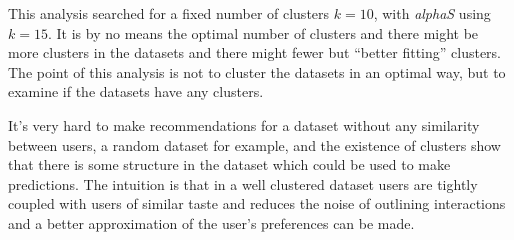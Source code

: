 This analysis searched for a fixed number of clusters $k = 10$, with \textit{alphaS} using $k = 15$. It is by no means the optimal number of clusters and there might be more clusters in the datasets and there might fewer but ``better fitting'' clusters. The point of this analysis is not to cluster the datasets in an optimal way, but to examine if the datasets have any clusters.

It's very hard to make recommendations for a dataset without any similarity between users, a random dataset for example, and the existence of clusters show that there is some structure in the dataset which could be used to make predictions. The intuition is that in a well clustered dataset users are tightly coupled with users of similar taste and reduces the noise of outlining interactions and a better approximation of the user's preferences can be made.

